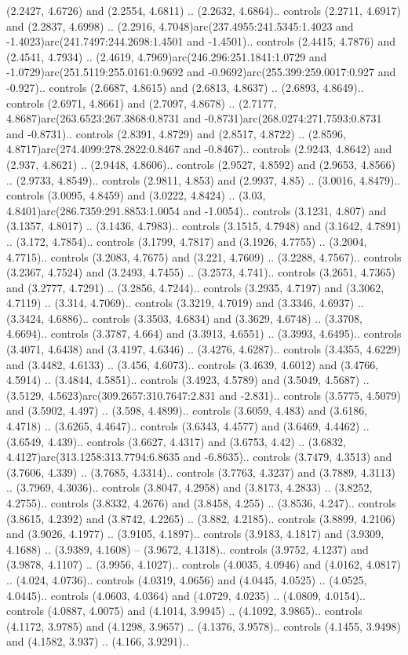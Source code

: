 (2.2427, 4.6726) and (2.2554, 4.6811) .. (2.2632, 4.6864).. controls (2.2711, 4.6917) and (2.2837, 4.6998) .. (2.2916, 4.7048)arc(237.4955:241.5345:1.4023 and -1.4023)arc(241.7497:244.2698:1.4501 and -1.4501).. controls (2.4415, 4.7876) and (2.4541, 4.7934) .. (2.4619, 4.7969)arc(246.296:251.1841:1.0729 and -1.0729)arc(251.5119:255.0161:0.9692 and -0.9692)arc(255.399:259.0017:0.927 and -0.927).. controls (2.6687, 4.8615) and (2.6813, 4.8637) .. (2.6893, 4.8649).. controls (2.6971, 4.8661) and (2.7097, 4.8678) .. (2.7177, 4.8687)arc(263.6523:267.3868:0.8731 and -0.8731)arc(268.0274:271.7593:0.8731 and -0.8731).. controls (2.8391, 4.8729) and (2.8517, 4.8722) .. (2.8596, 4.8717)arc(274.4099:278.2822:0.8467 and -0.8467).. controls (2.9243, 4.8642) and (2.937, 4.8621) .. (2.9448, 4.8606).. controls (2.9527, 4.8592) and (2.9653, 4.8566) .. (2.9733, 4.8549).. controls (2.9811, 4.853) and (2.9937, 4.85) .. (3.0016, 4.8479).. controls (3.0095, 4.8459) and (3.0222, 4.8424) .. (3.03, 4.8401)arc(286.7359:291.8853:1.0054 and -1.0054).. controls (3.1231, 4.807) and (3.1357, 4.8017) .. (3.1436, 4.7983).. controls (3.1515, 4.7948) and (3.1642, 4.7891) .. (3.172, 4.7854).. controls (3.1799, 4.7817) and (3.1926, 4.7755) .. (3.2004, 4.7715).. controls (3.2083, 4.7675) and (3.221, 4.7609) .. (3.2288, 4.7567).. controls (3.2367, 4.7524) and (3.2493, 4.7455) .. (3.2573, 4.741).. controls (3.2651, 4.7365) and (3.2777, 4.7291) .. (3.2856, 4.7244).. controls (3.2935, 4.7197) and (3.3062, 4.7119) .. (3.314, 4.7069).. controls (3.3219, 4.7019) and (3.3346, 4.6937) .. (3.3424, 4.6886).. controls (3.3503, 4.6834) and (3.3629, 4.6748) .. (3.3708, 4.6694).. controls (3.3787, 4.664) and (3.3913, 4.6551) .. (3.3993, 4.6495).. controls (3.4071, 4.6438) and (3.4197, 4.6346) .. (3.4276, 4.6287).. controls (3.4355, 4.6229) and (3.4482, 4.6133) .. (3.456, 4.6073).. controls (3.4639, 4.6012) and (3.4766, 4.5914) .. (3.4844, 4.5851).. controls (3.4923, 4.5789) and (3.5049, 4.5687) .. (3.5129, 4.5623)arc(309.2657:310.7647:2.831 and -2.831).. controls (3.5775, 4.5079) and (3.5902, 4.497) .. (3.598, 4.4899).. controls (3.6059, 4.483) and (3.6186, 4.4718) .. (3.6265, 4.4647).. controls (3.6343, 4.4577) and (3.6469, 4.4462) .. (3.6549, 4.439).. controls (3.6627, 4.4317) and (3.6753, 4.42) .. (3.6832, 4.4127)arc(313.1258:313.7794:6.8635 and -6.8635).. controls (3.7479, 4.3513) and (3.7606, 4.339) .. (3.7685, 4.3314).. controls (3.7763, 4.3237) and (3.7889, 4.3113) .. (3.7969, 4.3036).. controls (3.8047, 4.2958) and (3.8173, 4.2833) .. (3.8252, 4.2755).. controls (3.8332, 4.2676) and (3.8458, 4.255) .. (3.8536, 4.247).. controls (3.8615, 4.2392) and (3.8742, 4.2265) .. (3.882, 4.2185).. controls (3.8899, 4.2106) and (3.9026, 4.1977) .. (3.9105, 4.1897).. controls (3.9183, 4.1817) and (3.9309, 4.1688) .. (3.9389, 4.1608) -- (3.9672, 4.1318).. controls (3.9752, 4.1237) and (3.9878, 4.1107) .. (3.9956, 4.1027).. controls (4.0035, 4.0946) and (4.0162, 4.0817) .. (4.024, 4.0736).. controls (4.0319, 4.0656) and (4.0445, 4.0525) .. (4.0525, 4.0445).. controls (4.0603, 4.0364) and (4.0729, 4.0235) .. (4.0809, 4.0154).. controls (4.0887, 4.0075) and (4.1014, 3.9945) .. (4.1092, 3.9865).. controls (4.1172, 3.9785) and (4.1298, 3.9657) .. (4.1376, 3.9578).. controls (4.1455, 3.9498) and (4.1582, 3.937) .. (4.166, 3.9291).. 